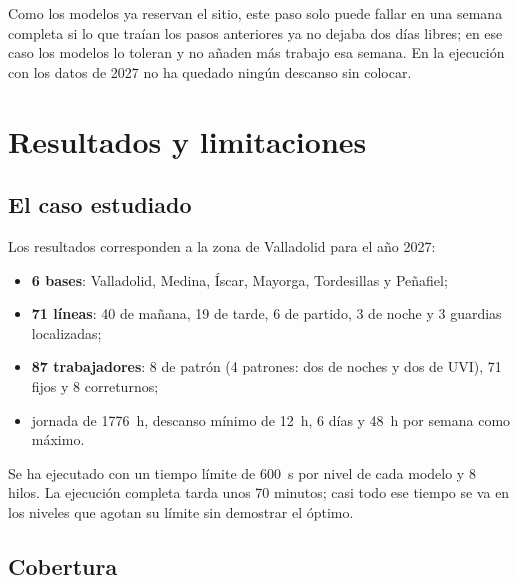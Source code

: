 \documentclass[11pt,a4paper]{article}
\begin{document}
Como los modelos ya reservan el sitio, este paso solo puede fallar en una semana completa si lo
que traían los pasos anteriores ya no dejaba dos días libres; en ese caso los modelos lo toleran
y no añaden más trabajo esa semana. En la ejecución con los datos de 2027 no ha quedado ningún
descanso sin colocar.

\section{Resultados y limitaciones}

\subsection{El caso estudiado}

Los resultados corresponden a la zona de Valladolid para el año 2027:
\begin{itemize}[nosep]
  \item \textbf{6 bases}: Valladolid, Medina, Íscar, Mayorga, Tordesillas y Peñafiel;
  \item \textbf{71 líneas}: 40 de mañana, 19 de tarde, 6 de partido, 3 de noche y 3 guardias
        localizadas;
  \item \textbf{87 trabajadores}: 8 de patrón (4 patrones: dos de noches y dos de UVI), 71 fijos y
        8 correturnos;
  \item jornada de 1776~h, descanso mínimo de 12~h, 6 días y 48~h por semana como máximo.
\end{itemize}
Se ha ejecutado con un tiempo límite de 600~s por nivel de cada modelo y 8 hilos. La ejecución
completa tarda unos 70 minutos; casi todo ese tiempo se va en los niveles que agotan su límite
sin demostrar el óptimo.

\subsection{Cobertura}
\end{document}
